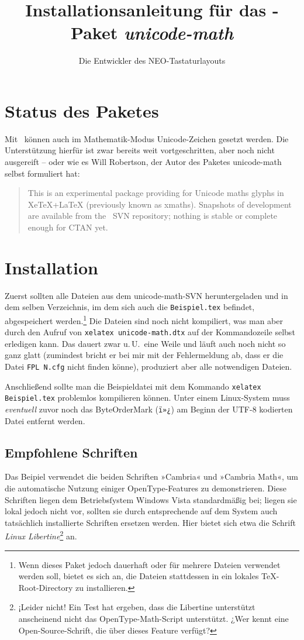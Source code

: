 ﻿\documentclass{scrartcl}
\begin{document}
\title{Installationsanleitung für das \XeTeX-Paket \emph{unicode-math}}
\author{Die Entwickler des NEO-Tastaturlayouts}
\maketitle
\tableofcontents

\section{Status des Paketes}
Mit \XeTeX\ können auch im Mathematik-Modus Unicode-Zeichen gesetzt werden. Die Unterstützung hierfür ist zwar bereits weit vortgeschritten, aber noch nicht ausgereift – oder wie es Will Robertson, der Autor des Paketes unicode-math selbst formuliert hat:
\begin{quote}
This is an experimental package providing for Unicode maths glyphs in XeTeX+LaTeX (previously known as xmaths). Snapshots of development are available from the \XeTeX\ SVN repository; nothing is stable or complete enough for CTAN yet.
\end{quote}

\section{Installation}
Zuerst sollten alle Dateien aus dem unicode-math-SVN heruntergeladen und in dem selben Verzeichnis, im dem sich auch die \verb|Beispiel.tex| befindet, abgespeichert werden.\footnote{Wenn dieses Paket jedoch dauerhaft oder für mehrere Dateien verwendet werden soll, bietet es sich an, die Dateien stattdessen in ein lokales \TeX-Root-Directory zu installieren.} Die Dateien sind noch nicht kompiliert, was man aber durch den Aufruf von \verb|xelatex unicode-math.dtx| auf der Kommandozeile selbst erledigen kann. Das dauert zwar u.\,U.\ eine Weile und läuft auch noch nicht so ganz glatt (zumindest bricht er bei mir mit der Fehlermeldung ab, dass er die Datei \verb|FPL N.cfg| nicht finden könne), produziert aber alle notwendigen Dateien.

Anschließend sollte man die Beispieldatei mit dem Kommando \verb|xelatex Beispiel.tex| problemlos kompilieren können. Unter einem Linux-System muss \emph{eventuell} zuvor noch das ByteOrderMark (\verb|ï»¿|) am Beginn der UTF-8 kodierten Datei entfernt werden.


\subsection{Empfohlene Schriften}
Das Beipiel verwendet die beiden Schriften »Cambria« und »Cambria Math«, um die automatische Nutzung einiger OpenType-Features zu demonstrieren. Diese Schriften liegen dem Betriebsſystem Windows Vista standardmäßig bei; liegen sie lokal jedoch nicht vor, sollten sie durch entsprechende auf dem System auch tatsächlich installierte Schriften ersetzen werden. Hier bietet sich etwa die  Schrift \emph{Linux Libertine}\footnote{¡Leider nicht! Ein Test hat ergeben, dass die Libertine unterstützt anscheinend nicht das OpenType-Math-Script unterstützt. ¿Wer kennt eine Open-Source-Schrift, die über dieses Feature verfügt?} an.
\end{document}
